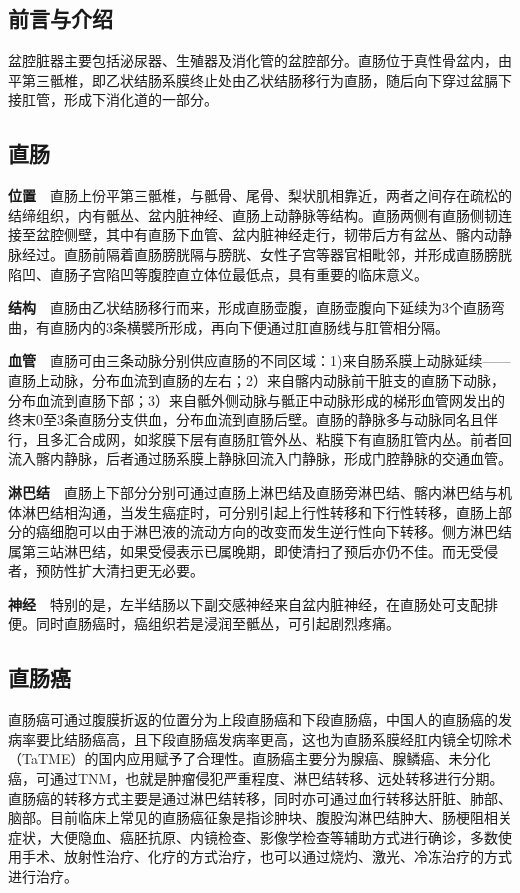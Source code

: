 \documentclass[a4paper,11pt,onecolumn,twoside]{article}
\begin{document}
\vspace{0.2cm}
\begin{multicols}{2}

    \section{前言与介绍}
    盆腔脏器主要包括泌尿器、生殖器及消化管的盆腔部分。直肠位于真性骨盆内，由平第三骶椎，即乙状结肠系膜终止处由乙状结肠移行为直肠，随后向下穿过盆膈下接肛管，形成下消化道的一部分。

    \subsection{直肠}

    \noindent\textbf{位置}~~直肠上份平第三骶椎，与骶骨、尾骨、梨状肌相靠近，两者之间存在疏松的结缔组织，内有骶丛、盆内脏神经、直肠上动静脉等结构。直肠两侧有直肠侧韧连接至盆腔侧壁，其中有直肠下血管、盆内脏神经走行，韧带后方有盆丛、髂内动静脉经过。直肠前隔着直肠膀胱隔与膀胱、女性子宫等器官相毗邻，并形成直肠膀胱陷凹、直肠子宫陷凹等腹腔直立体位最低点，具有重要的临床意义。

    \noindent\textbf{结构}~~直肠由乙状结肠移行而来，形成直肠壶腹，直肠壶腹向下延续为3个直肠弯曲，有直肠内的3条横襞所形成，再向下便通过肛直肠线与肛管相分隔。

    \noindent\textbf{血管}~~直肠可由三条动脉分别供应直肠的不同区域：1)来自肠系膜上动脉延续——直肠上动脉，分布血流到直肠的左右；2）来自髂内动脉前干脏支的直肠下动脉，分布血流到直肠下部；3）来自骶外侧动脉与骶正中动脉形成的梯形血管网发出的终末0至3条直肠分支供血，分布血流到直肠后壁。直肠的静脉多与动脉同名且伴行，且多汇合成网，如浆膜下层有直肠肛管外丛、粘膜下有直肠肛管内丛。前者回流入髂内静脉，后者通过肠系膜上静脉回流入门静脉，形成门腔静脉的交通血管。

    \noindent\textbf{淋巴结}~~直肠上下部分分别可通过直肠上淋巴结及直肠旁淋巴结、髂内淋巴结与机体淋巴结相沟通，当发生癌症时，可分别引起上行性转移和下行性转移，直肠上部分的癌细胞可以由于淋巴液的流动方向的改变而发生逆行性向下转移。侧方淋巴结属第三站淋巴结，如果受侵表示已属晚期，即使清扫了预后亦仍不佳。而无受侵者，预防性扩大清扫更无必要\supercite{DIWEI}。

    \noindent\textbf{神经}~~特别的是，左半结肠以下副交感神经来自盆内脏神经，在直肠处可支配排便。同时直肠癌时，癌组织若是浸润至骶丛，可引起剧烈疼痛。

    \subsection{直肠癌}
    直肠癌可通过腹膜折返的位置分为上段直肠癌和下段直肠癌，中国人的直肠癌的发病率要比结肠癌高，且下段直肠癌发病率更高，这也为直肠系膜经肛内镜全切除术（TaTME）的国内应用赋予了合理性。直肠癌主要分为腺癌、腺鳞癌、未分化癌，可通过TNM，也就是肿瘤侵犯严重程度、淋巴结转移、远处转移进行分期。直肠癌的转移方式主要是通过淋巴结转移，同时亦可通过血行转移达肝脏、肺部、脑部。目前临床上常见的直肠癌征象是指诊肿块、腹股沟淋巴结肿大、肠梗阻相关症状，大便隐血、癌胚抗原、内镜检查、影像学检查等辅助方式进行确诊，多数使用手术、放射性治疗、化疗的方式治疗，也可以通过烧灼、激光、冷冻治疗的方式进行治疗。


\end{multicols}
\end{document}
